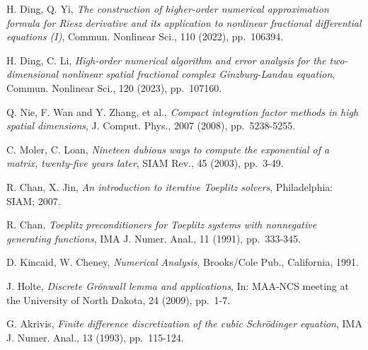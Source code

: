 \documentclass{siamart171218}
\numberwithin{theorem}{section}
\numberwithin{equation}{section}
\begin{document}
\begin{thebibliography}{99}
{\sc H. Ding,  Q. Yi}, {\em The construction of higher-order numerical approximation
formula for Riesz derivative and its application to nonlinear fractional differential
equations (I)}, Commun. Nonlinear Sci., 110 (2022), pp.~106394.

{\sc H. Ding, C. Li}, {\em High-order numerical algorithm and error analysis
 for the two-dimensional nonlinear spatial fractional complex Ginzburg-Landau
 equation}, Commun. Nonlinear Sci., 120 (2023), pp.~107160.

{\sc Q. Nie, F. Wan and Y. Zhang, et al.}, {\em Compact integration factor methods in high
spatial dimensions},  J. Comput. Phys., 2007 (2008), pp.~5238-5255.

{\sc C. Moler, C. Loan}, {\em Nineteen dubious ways to compute the exponential
 of a matrix, twenty-five years later}, SIAM Rev., 45 (2003), pp.~3-49.

{\sc R. Chan, X. Jin}, {\em An introduction to iterative Toeplitz solvers}, Philadelphia: SIAM; 2007.

{\sc R. Chan}, {\em Toeplitz preconditioners for Toeplitz systems with nonnegative
 generating functions}, IMA J. Numer. Anal., 11 (1991), pp.~333-345.


{\sc D. Kincaid, W. Cheney}, {\em Numerical Analysis}, Brooks/Cole Pub., California, 1991.

{\sc J. Holte}, {\em Discrete Gr\"{o}nwall lemma and applications}, In: MAA-NCS meeting at the
 University of North Dakota, 24 (2009), pp.~1-7.

{\sc  G. Akrivis}, {\em Finite difference discretization of the cubic
Schr\"{o}dinger equation}, IMA J. Numer. Anal., 13 (1993), pp.~115-124.


\end{thebibliography}
\end{document}
